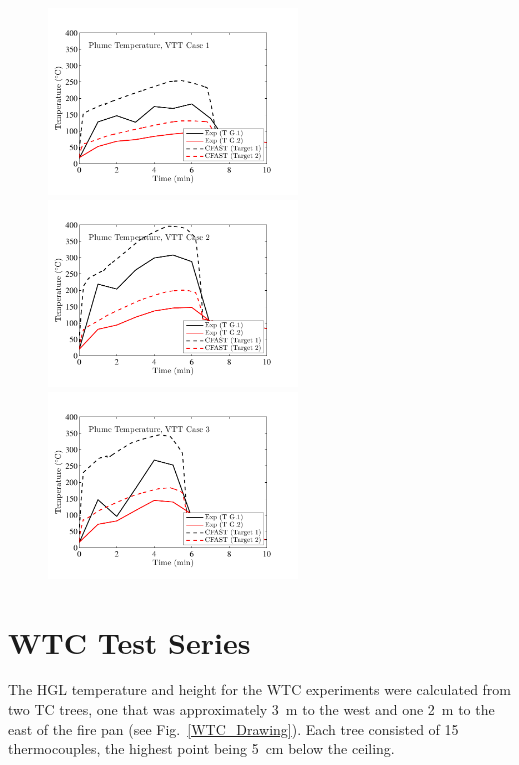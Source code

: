 \begin{figure}[p]
\begin{center}
\includegraphics[width=2.6in]{FIGURES/VTT/VTT_01_Plume_Temperature} \\
\includegraphics[width=2.6in]{FIGURES/VTT/VTT_02_Plume_Temperature} \\
\includegraphics[width=2.6in]{FIGURES/VTT/VTT_03_Plume_Temperature} 
\end{center}
\end{figure}

\clearpage

\section{WTC Test Series}

The HGL temperature and height for the WTC experiments were calculated from two TC trees, one that was approximately 3~m to the west and one 2~m to the east of the fire pan (see Fig.~\ref{WTC_Drawing}). Each tree consisted of 15 thermocouples, the highest point being 5~cm below the ceiling. 

